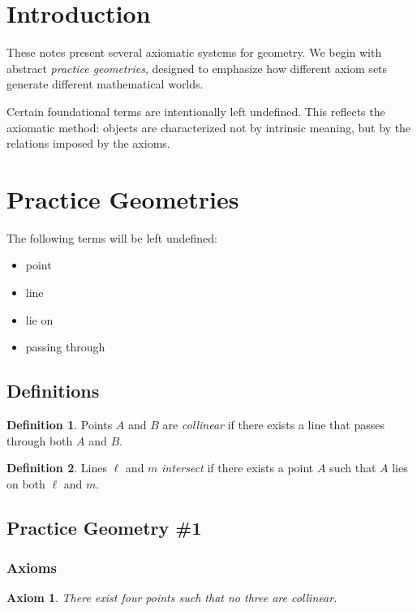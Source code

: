 \documentclass[11pt]{article}
\theoremstyle{definition}
\newtheorem{definition}{Definition}[section]
\theoremstyle{plain}
\newtheorem{axiom}{Axiom}[subsection]
\begin{document}
\section*{Introduction}

These notes present several axiomatic systems for geometry. We begin with abstract
\emph{practice geometries}, designed to emphasize how different axiom sets generate
different mathematical worlds.

Certain foundational terms are intentionally left undefined. This reflects the axiomatic
method: objects are characterized not by intrinsic meaning, but by the relations imposed
by the axioms.

\section{Practice Geometries}

The following terms will be left undefined:
\begin{itemize}
    \item point
    \item line
    \item lie on
    \item passing through
\end{itemize}

\subsection*{Definitions}

\begin{definition}
Points $A$ and $B$ are \emph{collinear} if there exists a line that passes through both $A$ and $B$.
\end{definition}

\begin{definition}
Lines $\ell$ and $m$ \emph{intersect} if there exists a point $A$ such that $A$ lies on both $\ell$
and $m$.
\end{definition}

\subsection{Practice Geometry \#1}

\subsubsection*{Axioms}

\begin{axiom}
There exist four points such that no three are collinear.
\end{axiom}
\end{document}
